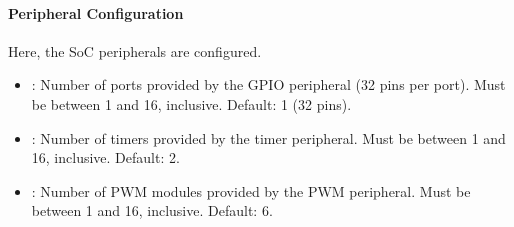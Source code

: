 \paragraph{Peripheral Configuration}
Here, the SoC peripherals are configured.
\begin{itemize}
    \item {}: Number of ports provided by the GPIO peripheral (32 pins per port). Must be between 1 and 16, inclusive. Default: 1 (32 pins).
    \item {}: Number of timers provided by the timer peripheral. Must be between 1 and 16, inclusive. Default: 2.
    \item {}: Number of PWM modules provided by the PWM peripheral. Must be between 1 and 16, inclusive. Default: 6.
\end{itemize}
